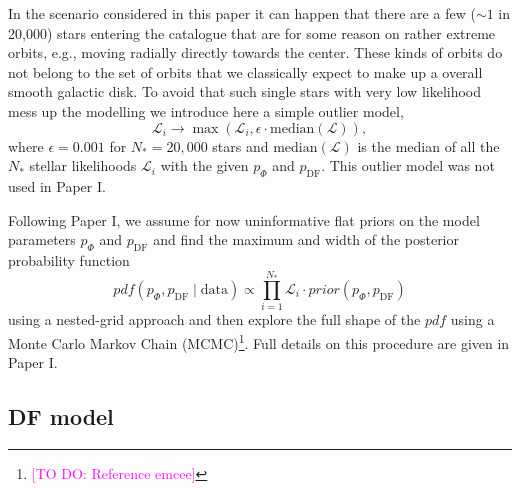 \documentclass[iop,revtex4,numberedappendix,appendixfloats]{emulateapj}
\newcommand{\pdf}{\ensuremath{pdf}}
\newcommand{\Wilma}[1]{\textcolor{Magenta}{#1}}
\begin{document}
In the scenario considered in this paper it can happen that there are a few ($\sim 1$ in 20,000) stars entering the catalogue that are for some reason  on rather extreme orbits, e.g., moving radially directly towards the center. These kinds of orbits do not belong to the set of orbits that we classically expect to make up a overall smooth galactic disk. To avoid that such single stars with very low likelihood mess up the modelling we introduce here a simple outlier model,
\begin{equation*}
\mathscr{L}_i \longrightarrow \max \left( \mathscr{L}_i, \epsilon \cdot \text{median}(\mathscr{L})\right),
\end{equation*}
where $\epsilon = 0.001$ for $N_*=20,000$ stars and $\text{median}(\mathscr{L})$ is the median of all the $N_*$ stellar likelihoods $\mathscr{L}_i$ with the given $p_\Phi$ and $p_\text{DF}$. This outlier model was not used in Paper I.

Following Paper I, we assume for now uninformative flat priors on the model parameters $p_\Phi$ and $p_\text{DF}$ and find the maximum and width of the posterior probability function
\begin{equation*}
pdf(p_\Phi,p_\text{DF} \mid \text{data}) \propto \prod_{i=1}^{N_*} \mathscr{L}_i \cdot prior(p_\Phi,p_\text{DF})
\end{equation*}
using a nested-grid approach and then explore the full shape of the $\pdf$ using a Monte Carlo Markov Chain (MCMC)\footnote{\Wilma{[TO DO: Reference emcee]}}. Full details on this procedure are given in Paper I.

\subsection{DF model}
\end{document}
